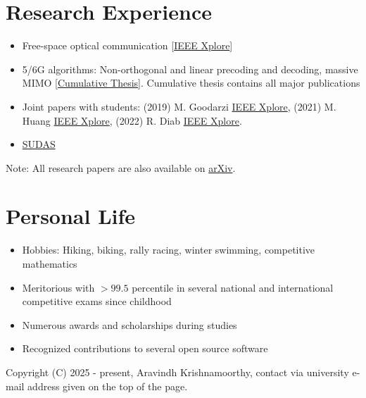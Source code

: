 \documentclass[a4paper,dvipsnames]{report}
\begin{document}
\section*{Research Experience}
\begin{itemize}
	\item Free-space optical communication [\href{https://ieeexplore.ieee.org/abstract/document/10974735}{IEEE Xplore}]
	\item 5/6G algorithms: Non-orthogonal and linear precoding and decoding, massive MIMO [\href{https://open.fau.de/handle/openfau/31976}{Cumulative Thesis}]. Cumulative thesis contains all major publications
	\item Joint papers with students: (2019) M. Goodarzi \href{https://ieeexplore.ieee.org/abstract/document/8661311}{IEEE Xplore}, (2021) M. Huang \href{https://doi.org/10.1109/WCNC49053.2021.9417424}{IEEE Xplore}, (2022) R. Diab \href{https://ieeexplore.ieee.org/document/9814475}{IEEE Xplore}.
	\item \href{https://www.iis.fraunhofer.de/en/ff/kom/mobile-kom/sudas.html}{SUDAS}
\end{itemize}
Note: All research papers are also available on \href{https://arxiv.org/a/krishnamoorthy_a_1.html}{arXiv}.

\hrulefill
\section*{Personal Life}
\begin{itemize}
	\item Hobbies: Hiking, biking, rally racing, winter swimming, competitive mathematics
	\item Meritorious with $> 99.5$ percentile in several national and international competitive exams since childhood
	\item Numerous awards and scholarships during studies
	\item Recognized contributions to several open source software
\end{itemize}
\hrulefill
\begin{center}
	Copyright (C) 2025 - present, Aravindh Krishnamoorthy, contact via university e-mail address given on the top of the page.
\end{center}
\end{document}
